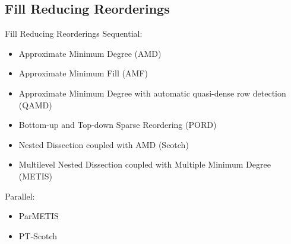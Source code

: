 \subsection{Fill Reducing Reorderings}

\begin{frame}[t]{Fill Reducing Reorderings}
	\small
	Sequential:
	\begin{itemize}
		\item Approximate Minimum Degree (AMD) \cite{reordering:AMD}
		
		\item Approximate Minimum Fill (AMF)
		
		\item  Approximate Minimum Degree with automatic quasi-dense row detection (QAMD) \cite{reordering:QAMD}
		
		\item Bottom-up and Top-down Sparse Reordering (PORD) \cite{reordering:PORD}
		
		\item Nested Dissection coupled with AMD (Scotch) \cite{reordering:SCOTCH}
		
		\item Multilevel Nested Dissection coupled with Multiple Minimum Degree (METIS) \cite{reordering:METIS}
	\end{itemize}

	Parallel:
	\begin{itemize}
		\item ParMETIS
		\item PT-Scotch
	\end{itemize}
	
\end{frame}